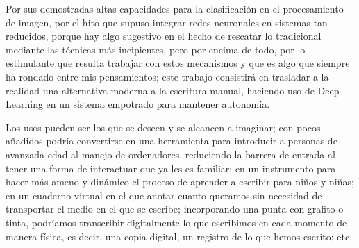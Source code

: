 Por sus demostradas altas capacidades para
la clasificación en el procesamiento de imagen, por el hito
que supuso integrar redes neuronales en sistemas tan reducidos,
porque hay algo sugestivo en el hecho de rescatar lo tradicional
mediante las técnicas más incipientes,
pero por encima de todo, por lo estimulante que resulta trabajar con
estos mecanismos y que es algo que siempre ha rondado entre mis pensamientos;
este trabajo consistirá
en trasladar a la realidad una alternativa moderna a la escritura
manual, haciendo uso de Deep Learning en un sistema empotrado
para mantener autonomía.

{\color{migris}Los usos pueden ser los que se deseen y se alcancen a imaginar;
con pocos añadidos podría convertirse en una herramienta para
introducir a personas de avanzada edad al manejo de ordenadores, reduciendo
la barrera de entrada al tener una forma de interactuar que ya les es familiar;
en un instrumento para hacer más ameno y dinámico el proceso de aprender
a escribir para niños y niñas; en un cuaderno virtual en el que anotar cuanto queramos sin necesidad de
transportar el medio en el que se escribe; incorporando una punta
con grafito o tinta, podríamos transcribir digitalmente lo que escribimos
en cada momento de manera física, es decir, una copia digital, un registro
de lo que hemos escrito; etc.}

\begin{comment}
Pero por qué no unir ambas experiencias para obtener la sensación de
escritura tradicional y la pretensión pragmática de utilizar nuevas
tecnologías.\\

Es lo que se plantea en este proyecto, un dispositivo que, haciendo
uso de las técnicas más modernas de inteligencia artificial, ayude a
la preservación de la escritura manual; facilitando la inclusión de
la misma en el uso ordinario de los dispositivos electrónicos.\\

Asimismo, en algunos casos sería una forma de incentivar e introducir
a personas poco habituadas al uso de la tecnología, ya que el hecho
de enfrentarse a un nuevo instrumento, puede suponer una barrera
psicológica al empezar para personas de avanzada edad.\newline
Otra posibilidad es enfocarlo como herramienta didáctica, para
que los niños aprendan a escribir de una forma divertida y atractiva.\\ 

Por tanto, el objetivo de este proyecto es desarrollar no solo
un dispositivo autónomo de captación de escritura manual, sino
un entorno completo con la finalidad de diluir la barrera entre
lo tradicional y lo moderno.
\end{comment}
